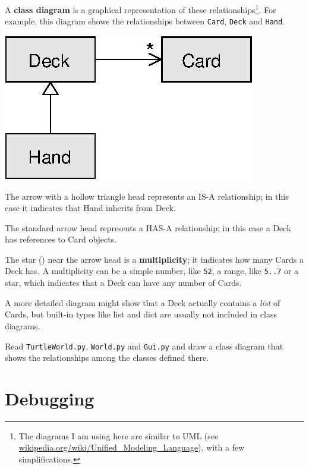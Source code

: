 \documentclass[10pt]{book}
\begin{document}

A {\bf class diagram} is a graphical representation of these
relationships\footnote{The diagrams I am using here are similar to UML
  (see \url{wikipedia.org/wiki/Unified_Modeling_Language}), with a few
  simplifications.}.  For example, this diagram shows the
relationships between {\tt Card}, {\tt Deck} and {\tt Hand}.

\beforefig
\centerline{\includegraphics{figs/class1.eps}}
\afterfig

The arrow with a hollow triangle head represents an IS-A
relationship; in this case it indicates that Hand inherits
from Deck.

The standard arrow head represents a HAS-A
relationship; in this case a Deck has references to Card
objects.


The star ({\tt *}) near the arrow head is a 
{\bf multiplicity}; it indicates how many Cards a Deck has.
A multiplicity can be a simple number, like {\tt 52}, a range,
like {\tt 5..7} or a star, which indicates that a Deck can
have any number of Cards.

A more detailed diagram might show that a Deck actually
contains a {\em list} of Cards, but built-in types
like list and dict are usually not included in class diagrams.

\begin{ex}
Read {\tt TurtleWorld.py}, {\tt World.py} and {\tt Gui.py}
and draw a class diagram that shows the relationships among
the classes defined there.
\end{ex}


\section{Debugging}
\end{document}
